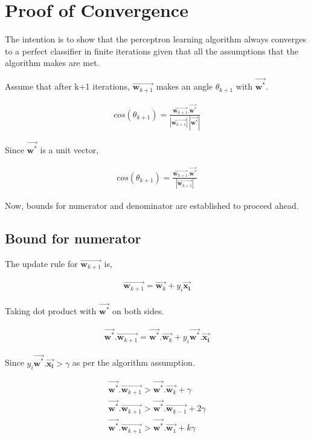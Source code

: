 \documentclass[11pt, a4paper]{article}
\begin{document}
\FloatBarrier

\section{Proof of Convergence}

The intention is to show that the perceptron learning algorithm always converges to a perfect classifier in finite iterations given that all the assumptions that the algorithm makes are met.

 
Assume that after k+1 iterations, $\vec{\boldsymbol{w}_{k+1}}$ makes an angle $\theta_{k+1}$ with $\vec{\boldsymbol{w}^*}$. 
 
\begin{align*}
	cos(\theta_{k+1}) = \frac{\vec{\boldsymbol{w}_{k+1}}.\vec{\boldsymbol{w}^*}}{|\vec{\boldsymbol{w}_{k+1}}|\ |\vec{\boldsymbol{w}^*}|} 
\end{align*}
 
Since $\vec{\boldsymbol{w}^*}$ is a unit vector,
 
\begin{align*}
	cos(\theta_{k+1}) = \frac{\vec{\boldsymbol{w}_{k+1}}.\vec{\boldsymbol{w}^*}}{|\vec{\boldsymbol{w}_{k+1}}|} 
\end{align*}
 
Now, bounds for numerator and denominator are established to proceed ahead.
 
\subsection{Bound for numerator}
 
The update rule for $\vec{\boldsymbol{w}_{k+1}}$ is,
 
\begin{align*}
	\vec{\boldsymbol{w}_{k+1}} = \vec{\boldsymbol{w}_k} + y_i \vec{\boldsymbol{\boldsymbol{x}_i}} 
\end{align*}
 
Taking dot product with $\vec{\boldsymbol{w}^*}$ on both sides.
 
\begin{align*}
	\vec{\boldsymbol{w}^*}.\vec{\boldsymbol{w}_{k+1}} = \vec{\boldsymbol{w}^*}.\vec{\boldsymbol{w}_k} + y_i \vec{\boldsymbol{w}^*}.\vec{\boldsymbol{\boldsymbol{x}_i}} 
\end{align*} 
 
Since $y_i \vec{\boldsymbol{w}^*}.\vec{\boldsymbol{\boldsymbol{x}_i}} > \gamma$ as per the algorithm assumption.
 
\begin{align*}
	\vec{\boldsymbol{w}^*}.\vec{\boldsymbol{w}_{k+1}} > \vec{\boldsymbol{w}^*}.\vec{\boldsymbol{w}_k} + \gamma      \\
	\vec{\boldsymbol{w}^*}.\vec{\boldsymbol{w}_{k+1}} > \vec{\boldsymbol{w}^*}.\vec{\boldsymbol{w}_{k-1}} + 2\gamma \\
	\vec{\boldsymbol{w}^*}.\vec{\boldsymbol{w}_{k+1}} > \vec{\boldsymbol{w}^*}.\vec{\boldsymbol{w}_{1}} + k\gamma   
\end{align*}   
 
\end{document}
